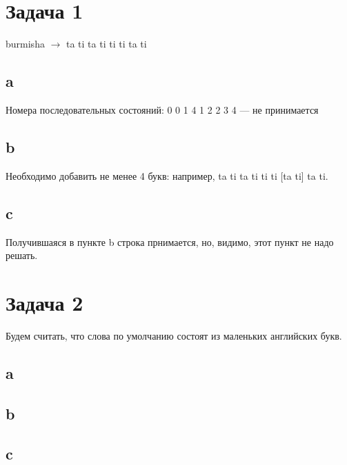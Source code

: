 \documentclass[12pt]{article}
\begin{document}
\section{Задача 1}
burmisha $\to$ ta ti ta ti ti ti ta ti \\
\subsection{a}
Номера последовательных состояний: 0 0 1 4 1 2 2 3 4 --- не принимается
\subsection{b}
Необходимо добавить не менее 4 букв: например, ta ti ta ti ti ti [ta ti] ta ti.
\subsection{c} 
Получившаяся в пункте b строка прнимается, но, видимо, этот пункт не надо решать.

\section{Задача 2}
Будем считать, что слова по умолчанию состоят из маленьких английских букв.
\subsection{a}
\subsection{b}
\subsection{c}
\end{document}
